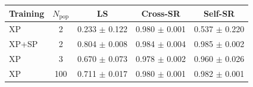 \begin{tabular}{lcccc}
\toprule
Training & $N_{\mathrm{pop}}$ & LS & Cross-SR & Self-SR \\
\midrule
XP & 2 & 0.233 $\pm$ 0.122 & 0.980 $\pm$ 0.001 & 0.537 $\pm$ 0.220 \\
XP+SP & 2 & 0.804 $\pm$ 0.008 & 0.984 $\pm$ 0.004 & 0.985 $\pm$ 0.002 \\
XP & 3 & 0.670 $\pm$ 0.073 & 0.978 $\pm$ 0.002 & 0.960 $\pm$ 0.026 \\
XP & 100 & 0.711 $\pm$ 0.017 & 0.980 $\pm$ 0.001 & 0.982 $\pm$ 0.001 \\
\bottomrule
\end{tabular}
